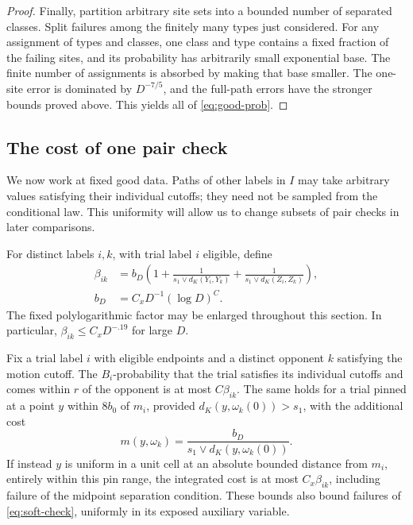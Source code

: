 \begin{proof}
Finally, partition arbitrary site sets into a bounded number of
separated classes.  Split failures among the finitely many types just
considered.  For any assignment of types and classes, one class and
type contains a fixed fraction of the failing sites, and its
probability has arbitrarily small exponential base.  The finite
number of assignments is absorbed by making that base smaller.
The one-site error is dominated by $D^{-7/5}$, and the full-path
errors have the stronger bounds proved above.  This yields all of
\eqref{eq:good-prob}.
\end{proof}

\subsection{The cost of one pair check}

We now work at fixed good data.  Paths of other labels in $I$ may take
arbitrary values satisfying their individual cutoffs; they need not be
sampled from the conditional law.  This uniformity will allow us to
change subsets of pair checks in later comparisons.

For distinct labels $i,k$, with trial label $i$ eligible, define
\begin{equation}\label{eq:beta}
\begin{split}
 \beta_{ik}&=b_D\left(1+
    \frac1{s_1\vee d_K(Y_i,Y_k)}+
    \frac1{s_1\vee d_K(Z_i,Z_k)}\right),\\
 b_D&=C_xD^{-1}(\log D)^C.
\end{split}
\end{equation}
The fixed polylogarithmic factor may be enlarged throughout this
section.  In particular, $\beta_{ik}\le C_xD^{-.19}$ for large $D$.

\begin{lemma}\label{lem:collision-cost}
Fix a trial label $i$ with eligible endpoints and a distinct opponent
$k$ satisfying the motion cutoff.  The $B_i$-probability that the trial
satisfies its individual cutoffs and comes within $r$ of the opponent
is at most $C\beta_{ik}$.  The same holds for a trial pinned at a point
$y$ within $8b_0$ of $m_i$, provided
$d_K(y,\omega_k(0))>s_1$, with the additional cost
\begin{equation}\label{eq:midpoint-cost}
                   m(y,\omega_k)=
                       \frac{b_D}{s_1\vee d_K(y,\omega_k(0))}.
\end{equation}
If instead $y$ is uniform in a unit cell at an absolute bounded
distance from $m_i$, entirely within this pin range, the integrated
cost is at most $C_x\beta_{ik}$, including failure of the midpoint
separation condition.  These bounds also bound failures of
\eqref{eq:soft-check}, uniformly in its exposed auxiliary variable.
\end{lemma}

